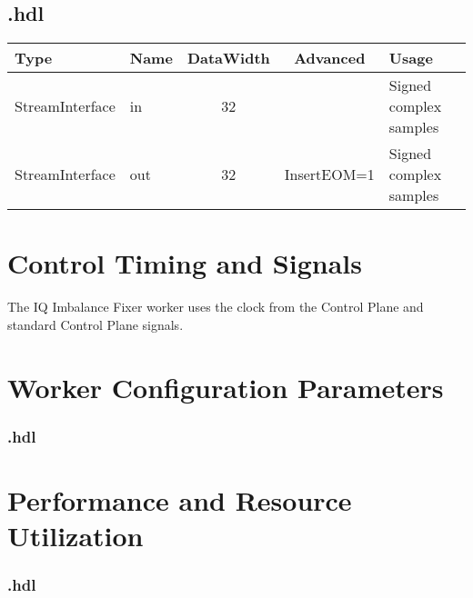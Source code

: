 \begin{landscape}
	\subsection*{\comp.hdl}
	\begin{scriptsize}
		\begin{tabular}{|M{2cm}|M{1.5cm}|c|c|M{12cm}|}
			\hline
			Type            & Name & DataWidth & Advanced                & Usage                  \\
			\hline
			StreamInterface & in   & 32        & & Signed complex samples \\
			\hline
			StreamInterface & out  & 32        & InsertEOM=1 & Signed complex samples \\
			\hline
		\end{tabular}
	\end{scriptsize}
\end{landscape}

\section*{Control Timing and Signals}
\begin{flushleft}
The IQ Imbalance Fixer worker uses the clock from the Control Plane and standard Control Plane signals.
\end{flushleft}

\begin{landscape}
\section*{Worker Configuration Parameters}
\subsubsection*{\comp.hdl}
%
\section*{Performance and Resource Utilization}
\subsubsection*{\comp.hdl}
%
\end{landscape}

